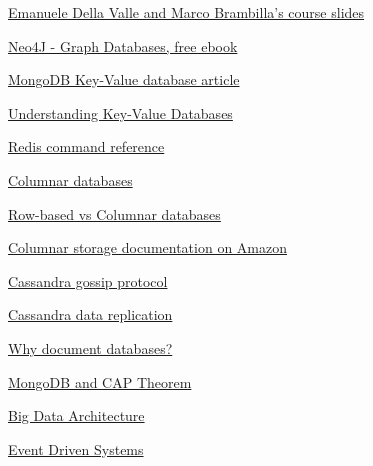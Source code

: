 \documentclass[10pt,a4paper]{article}
\begin{document}
\begin{thebibliography}{1}
\newblock\href{http://datascience.deib.polimi.it/course/unstructured-and-streaming-data-engineering/}{Emanuele Della Valle and Marco Brambilla's course slides}

\newblock \href{https://neo4j.com/graph-databases-book/?ref=home}{Neo4J - Graph Databases, free ebook}

\newblock \href{https://www.mongodb.com/key-value-database}{MongoDB Key-Value database article}

\newblock \href{https://www.dataversity.net/understanding-key-value-databases/}{Understanding Key-Value Databases}

\newblock \href{https://redis.io/commands}{Redis command reference}

\newblock\href{https://www.stitchdata.com/columnardatabase/}{Columnar databases}

\newblock \href{https://medium.com/@mangatmodi/rowise-vs-columnar-database-theory-and-in-practice-53f54c8f6505}{Row-based vs Columnar databases}

\newblock \href{https://docs.aws.amazon.com/redshift/latest/dg/c_columnar_storage_disk_mem_mgmnt.html}{Columnar storage documentation on Amazon}

\newblock \href{https://docs.datastax.com/en/cassandra-oss/3.0/cassandra/architecture/archGossipAbout.html}{Cassandra gossip protocol}

\newblock \href{https://www.guru99.com/cassandra-architecture.html#:~:text=There\%20are\%20two\%20kinds\%20of\%20replication\%20strategies\%20in\%20Cassandra.&text=SimpleStrategy\%20is\%20used\%20when\%20you,direction\%20in\%20the\%20Node\%20ring.}{Cassandra data replication}

\newblock \href{https://www.mongodb.com/document-databases}{Why document databases?}

\newblock \href{https://www.ibm.com/cloud/learn/cap-theorem#toc-mongodb-an-IH4u4oCK}{MongoDB and CAP Theorem}

\newblock \href{https://www.omnisci.com/technical-glossary/big-data-architecture}{Big Data Architecture}

\newblock \href{https://medium.com/omarelgabrys-blog/event-driven-systems-cdbe5a4b3d04}{Event Driven Systems}


\end{thebibliography}
\end{document}
